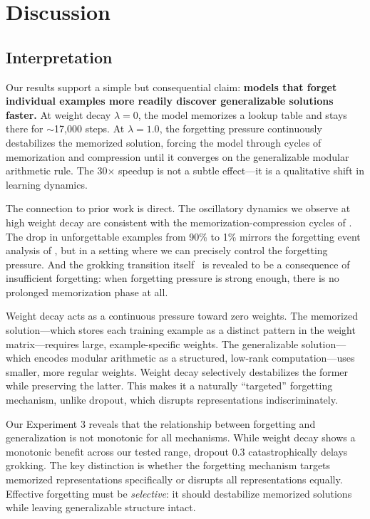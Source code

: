\section{Discussion}
\label{sec:discussion}

\subsection{Interpretation}

Our results support a simple but consequential claim: \textbf{models that forget individual examples more readily discover generalizable solutions faster.} At weight decay $\lambda = 0$, the model memorizes a lookup table and stays there for ${\sim}$17,000 steps. At $\lambda = 1.0$, the forgetting pressure continuously destabilizes the memorized solution, forcing the model through cycles of memorization and compression until it converges on the generalizable modular arithmetic rule. The 30$\times$ speedup is not a subtle effect---it is a qualitative shift in learning dynamics.

The connection to prior work is direct. The oscillatory dynamics we observe at high weight decay are consistent with the memorization-compression cycles of \citet{yu2025memorization}. The drop in unforgettable examples from 90\% to 1\% mirrors the forgetting event analysis of \citet{toneva2019empirical}, but in a setting where we can precisely control the forgetting pressure. And the grokking transition itself~\cite{power2022grokking} is revealed to be a consequence of insufficient forgetting: when forgetting pressure is strong enough, there is no prolonged memorization phase at all.

 Weight decay acts as a continuous pressure toward zero weights. The memorized solution---which stores each training example as a distinct pattern in the weight matrix---requires large, example-specific weights. The generalizable solution---which encodes modular arithmetic as a structured, low-rank computation---uses smaller, more regular weights. Weight decay selectively destabilizes the former while preserving the latter. This makes it a naturally ``targeted'' forgetting mechanism, unlike dropout, which disrupts representations indiscriminately.

 Our Experiment 3 reveals that the relationship between forgetting and generalization is not monotonic for all mechanisms. While weight decay shows a monotonic benefit across our tested range, dropout 0.3 catastrophically delays grokking. The key distinction is whether the forgetting mechanism targets memorized representations specifically or disrupts all representations equally. Effective forgetting must be \emph{selective}: it should destabilize memorized solutions while leaving generalizable structure intact.

